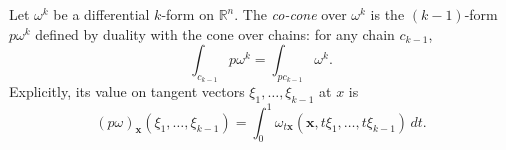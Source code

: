 Let $\omega^k$ be a differential $k$-form on $\mathbb{R}^n$. The \textit{co-cone} over $\omega^k$ is the $(k-1)$-form $p\omega^k$ defined by duality with the cone over chains: for any chain $c_{k-1}$,
$$\int_{c_{k-1}} p\omega^k = \int_{p c_{k-1}} \omega^k.$$
Explicitly, its value on tangent vectors $\xi_1, \ldots, \xi_{k-1}$ at $x$ is
$$(p\omega)_{\mathbf{x}}(\xi_1, \ldots, \xi_{k-1}) = \int_0^1 \omega_{t\mathbf{x}}(\mathbf{x}, t\xi_1, \ldots, t\xi_{k-1})\, dt.$$
